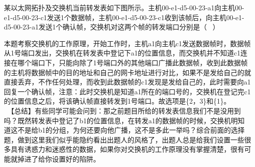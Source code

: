 某以太网拓扑及交换机当前转发表如下图所示。主机00-e1-d5-00-23-a1向主机00-e1-d5-00-23-c1发送1个数据帧，主机00-e1-d5-00-23-c1收到该帧后，向主机00-e1-d5-00-23-a1发送1个确认帧，交换机对这两个帧的转发端口分别是（
~）
\par{}
\begin{solution}本题考察交换机的工作原理，开始工作时，主机a1向主机c1发送数据帧时，数据帧从1号端口发出，交换机在转发表中登记下a1的位置信息，而交换机并不知道c1连接在哪个端口下，只能向除了1号端口外的其他端口广播此数据帧，收到此数据帧的主机将数据帧中的目的地址和自己的网卡地址进行对比，如果不是发给自己的就直接丢弃，不作任何处理，而收到此数据帧的c1发现是发给自己的，此时需要向a1回复一个确认帧，注意：此时交换机是知道a1所在的端口号的，交换机在登记完c1的位置信息之后，将该确认帧直接转发到1号端口。故选项是\{2，3\}和\{1\}。
~ ~
~【总结】有些同学可能会问到：那之前题目所给的转发表信息我们不是没用到吗？既然转发表中登记了b1的位置信息，在转发a1的数据帧的时候，交换机明知道这不是给b1的分组，为何还要向他广播，这不是多此一举吗？综合前面的选择题，做到这里我们似乎能隐约看出出题人的风格了，出题人总是给我们设置一些很多具有诱惑力和迷惑性的数据，如果你对交换机的工作原理没有掌握清楚，很有可能就掉进了给你设置好的陷阱。
\end{solution}
